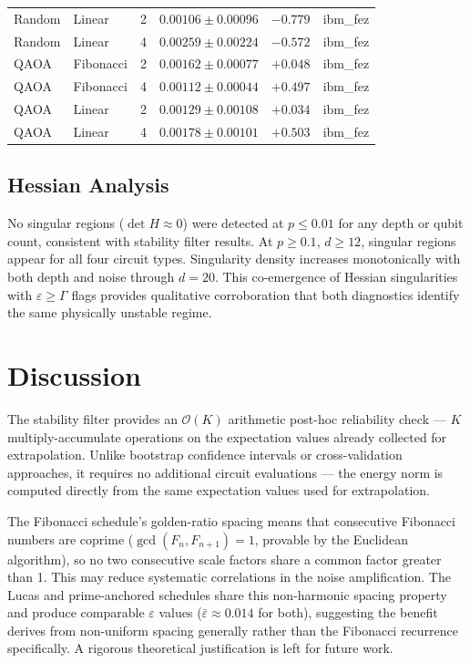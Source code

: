 \documentclass[10pt,letterpaper]{article}
\begin{document}
\begin{table}[H]
\begin{tabular}{llcrcc}
Random  & Linear    & 2 & $0.00106\pm0.00096$ & $-0.779$ & ibm\_fez \\
Random  & Linear    & 4 & $0.00259\pm0.00224$ & $-0.572$ & ibm\_fez \\
\midrule
QAOA    & Fibonacci & 2 & $0.00162\pm0.00077$ & $+0.048$ & ibm\_fez \\
QAOA    & Fibonacci & 4 & $0.00112\pm0.00044$ & $+0.497$ & ibm\_fez \\
QAOA    & Linear    & 2 & $0.00129\pm0.00108$ & $+0.034$ & ibm\_fez \\
QAOA    & Linear    & 4 & $0.00178\pm0.00101$ & $+0.503$ & ibm\_fez \\
\bottomrule
\end{tabular}
\end{table}

\subsection{Hessian Analysis}

No singular regions ($\det H\approx 0$) were detected at $p\leq 0.01$
for any depth or qubit count, consistent with stability filter results.
At $p\geq 0.1$, $d\geq 12$, singular regions appear for all four
circuit types. Singularity density increases monotonically with both
depth and noise through $d=20$. This co-emergence of Hessian
singularities with $\varepsilon\geq\Gamma$ flags provides qualitative
corroboration that both diagnostics identify the same physically
unstable regime.

\clearpage  %
\section{Discussion}
\label{sec:discussion}

The stability filter provides an $\mathcal{O}(K)$ arithmetic
post-hoc reliability check --- $K$ multiply-accumulate operations
on the expectation values already collected for extrapolation.
Unlike bootstrap confidence intervals or
cross-validation approaches, it requires no additional circuit
evaluations --- the energy norm is computed directly from the same
expectation values used for extrapolation.

The Fibonacci schedule's golden-ratio spacing means that consecutive
Fibonacci numbers are coprime ($\gcd(F_n, F_{n+1})=1$, provable by
the Euclidean algorithm), so no two consecutive scale factors share
a common factor greater than 1. This may reduce systematic correlations
in the noise amplification. The Lucas and prime-anchored schedules share
this non-harmonic spacing property and produce comparable $\varepsilon$
values ($\bar\varepsilon\approx 0.014$ for both), suggesting the benefit
derives from non-uniform spacing generally rather than the Fibonacci
recurrence specifically. A rigorous theoretical justification is left
for future work.
\end{document}
